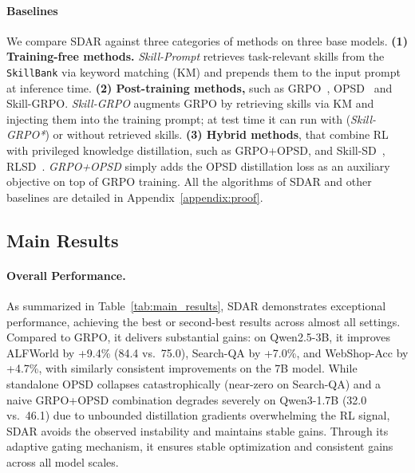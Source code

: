 \documentclass{llmxive}
\providecommand{\methodname}{\textsc{SDAR}\xspace}
\begin{document}
\paragraph{Baselines}
We compare \methodname{} against three categories of methods on three base models.
  \textbf{(1) Training-free methods.}
  \textit{Skill-Prompt} retrieves task-relevant skills from the \texttt{SkillBank} via keyword
  matching (KM) and prepends them to the input prompt at inference time.
  \textbf{(2) Post-training methods,} such as GRPO~\citep{shao2024deepseekmath}, OPSD~\citep{zhao2026opsd} and Skill-GRPO. \textit{Skill-GRPO} augments GRPO by retrieving skills via KM and injecting them into the
  training prompt;
  at test time it can run with (\textit{Skill-GRPO*}) or without retrieved skills.
  \textbf{(3) Hybrid methods}, that combine RL with privileged knowledge distillation, such as GRPO+OPSD, and Skill-SD~\citep{wang2026skillsd}, RLSD~\citep{yang2026rlsd}.  
  \textit{GRPO+OPSD} simply adds the OPSD distillation loss as an auxiliary objective on top of GRPO training. All the algorithms of \methodname{} and other baselines are detailed in Appendix~\ref{appendix:proof}.
\subsection{Main Results}
\paragraph{Overall Performance.}          
As summarized in Table~\ref{tab:main_results}, \methodname{} demonstrates exceptional performance, achieving the best or second-best results across almost all settings. Compared to GRPO, it delivers substantial gains: on Qwen2.5-3B, it improves ALFWorld by +9.4\% (84.4 vs.\ 75.0), Search-QA by +7.0\%, and WebShop-Acc by +4.7\%, with similarly consistent improvements on the 7B model. While standalone OPSD collapses catastrophically (near-zero on Search-QA) and a naive GRPO+OPSD combination degrades severely on Qwen3-1.7B (32.0 vs.\ 46.1) due to unbounded distillation gradients overwhelming the RL signal, \methodname{} avoids the observed instability and maintains stable gains. Through its adaptive gating mechanism, it ensures stable optimization and consistent gains across all model scales.
 
\end{document}
